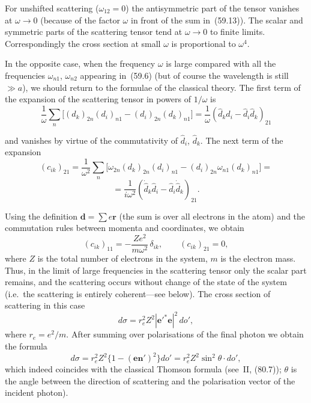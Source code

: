 For unshifted scattering ($\omega_{12} = 0$) the antisymmetric part of the tensor vanishes at $\omega \to 0$ (because of the factor $\omega$ in front of the sum in~(59.13)). The scalar and symmetric parts of the scattering tensor tend at $\omega \to 0$ to finite limits. Correspondingly the cross section at small $\omega$ is proportional to $\omega^4$.

In the opposite case, when the frequency $\omega$ is large compared with all the frequencies $\omega_{n1}$, $\omega_{n2}$ appearing in~(59.6) (but of course the wavelength is still $\gg a$), we should return to the formulae of the classical theory. The first term of the expansion of the scattering tensor in powers of $1/\omega$ is
\[
\frac{1}{\omega}\sum_n\bigl[(d_k)_{2n}(d_i)_{n1} - (d_i)_{2n}(d_k)_{n1}\bigr] = \frac{1}{\omega}(\hat{d}_k\hat{d}_i - \hat{d}_i\hat{d}_k)_{21}
\]

and vanishes by virtue of the commutativity of $\hat{d}_i$, $\hat{d}_k$. The next term of the expansion
\[
(c_{ik})_{21} = \frac{1}{\omega^2}\sum_n\bigl[\omega_{2n}(d_k)_{2n}(d_i)_{n1} - (d_i)_{2n}\omega_{n1}(d_k)_{n1}\bigr] =
\]
\[
= \frac{1}{i\omega^2}(\dot{\hat{d}}_k\hat{d}_i - \hat{d}_i\dot{\hat{d}}_k)_{21}.
\]

Using the definition $\mathbf{d} = \sum e\mathbf{r}$ (the sum is over all electrons in the atom) and the commutation rules between momenta and coordinates, we obtain
\begin{equation}
(c_{ik})_{11} = -\frac{Ze^2}{m\omega^2}\,\delta_{ik},\qquad (c_{ik})_{21} = 0,
\tag{59.14}
\end{equation}
where $Z$ is the total number of electrons in the system, $m$ is the electron mass. Thus, in the limit of large frequencies in the scattering tensor only the scalar part remains, and the scattering occurs without change of the state of the system (i.e.\ the scattering is entirely coherent---see below). The cross section of scattering in this case
\begin{equation}
d\sigma = r^2_e Z^2|\mathbf{e}'^*\mathbf{e}|^2\,do',
\tag{59.15}
\end{equation}
where $r_e = e^2/m$. After summing over polarisations of the final photon we obtain the formula
\begin{equation}
d\sigma = r^2_e Z^2\{1 - (\mathbf{en}')^2\}do' = r^2_e Z^2\sin^2\theta \cdot do',
\tag{59.16}
\end{equation}
which indeed coincides with the classical Thomson formula (see~II, (80.7)); $\theta$ is the angle between the direction of scattering and the polarisation vector of the incident photon).

